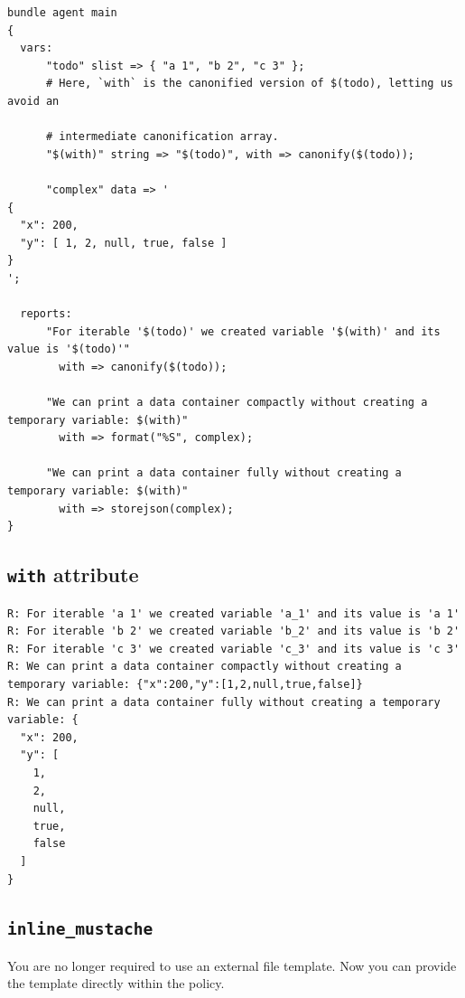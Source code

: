 \documentclass[11pt]{article}
\begin{document}
\begin{verbatim}
bundle agent main
{
  vars:
      "todo" slist => { "a 1", "b 2", "c 3" };
      # Here, `with` is the canonified version of $(todo), letting us avoid an

      # intermediate canonification array.
      "$(with)" string => "$(todo)", with => canonify($(todo));

      "complex" data => '
{
  "x": 200,
  "y": [ 1, 2, null, true, false ]
}
';

  reports:
      "For iterable '$(todo)' we created variable '$(with)' and its value is '$(todo)'"
        with => canonify($(todo));

      "We can print a data container compactly without creating a temporary variable: $(with)"
        with => format("%S", complex);

      "We can print a data container fully without creating a temporary variable: $(with)"
        with => storejson(complex);
}
\end{verbatim}

\subsection*{\texttt{with} attribute}
\label{sec:org28cd640}

\begin{verbatim}
R: For iterable 'a 1' we created variable 'a_1' and its value is 'a 1'
R: For iterable 'b 2' we created variable 'b_2' and its value is 'b 2'
R: For iterable 'c 3' we created variable 'c_3' and its value is 'c 3'
R: We can print a data container compactly without creating a temporary variable: {"x":200,"y":[1,2,null,true,false]}
R: We can print a data container fully without creating a temporary variable: {
  "x": 200,
  "y": [
    1,
    2,
    null,
    true,
    false
  ]
}
\end{verbatim}

\subsection*{\texttt{inline\_mustache}}
\label{sec:orge726f0e}

\begin{NOTES}
You are no longer required to use an external file template. Now you can
provide the template directly within the policy.
\end{NOTES}
\end{document}
